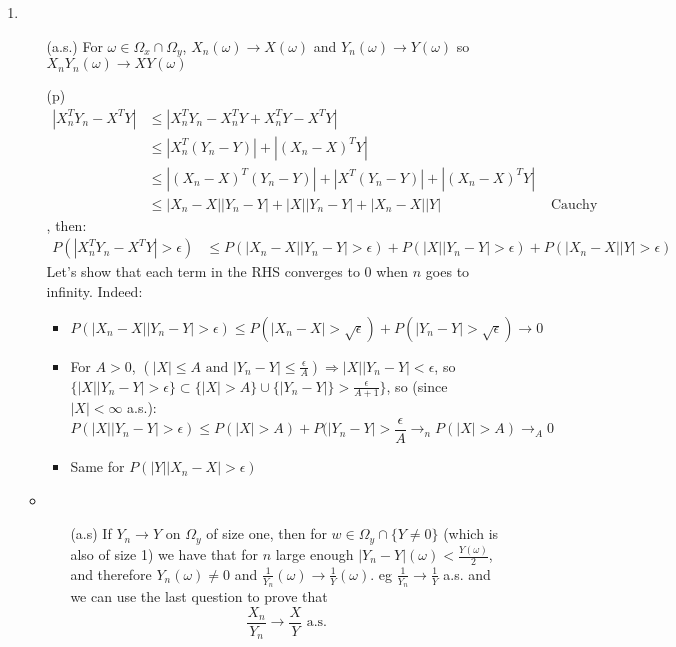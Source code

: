 \documentclass[12pt]{article}
\begin{document}
\begin{enumerate}
  \item 
    \begin{itemize}
    \item[(a.s.)] For $\omega \in \Omega_x \cap \Omega_y$, $X_n(\omega) \rightarrow X(\omega)$ and $Y_n(\omega) \rightarrow Y(\omega)$ so $X_nY_n(\omega) \rightarrow XY(\omega)$
    \item[(p)]
    \begin{align*}|X_n^TY_n - X^TY| &\le |X_n^TY_n - X_n^TY + X_n^TY -
      X^TY| \\&\le |X_n^T(Y_n - Y)| + |(X_n-X)^TY| \\&\le
      |(X_n-X)^T(Y_n - Y)| + |X^T(Y_n-Y)| + |(X_n-X)^TY| \\&\le
      |X_n-X| |Y_n - Y| + |X| |Y_n-Y| + |X_n-X| |Y| &\text{ Cauchy
        Shwartz}
    \end{align*}
    , then:
    \begin{align*}
      P(|X_n^TY_n - X^TY| > \epsilon)
      &\le P(|X_n-X| |Y_n - Y|  > \epsilon) + P(|X| |Y_n-Y| > \epsilon) + P(|X_n-X| |Y| > \epsilon)
    \end{align*}
    Let's show that each term in the RHS converges to 0 when $n$ goes
    to infinity. Indeed:
    \begin{itemize}
    \item
      $P(|X_n-X| |Y_n - Y| > \epsilon)\le P(|X_n - X| >
      \sqrt{\epsilon}) + P(|Y_n - Y| > \sqrt{\epsilon}) \rightarrow 0$
    \item For $A > 0$,
      $(|X| \le A \text{ and } |Y_n-Y| \le \frac{\epsilon}{A}) \Rightarrow |X|
      |Y_n - Y| < \epsilon$,
      so
      $\{|X| |Y_n - Y| > \epsilon \} \subset \{|X|>A\} \cup \{|Y_n-Y|
      \} > \frac{\epsilon}{A+1}\}$, so (since $|X| < \infty$ a.s.):
    $$P(|X| |Y_n-Y| > \epsilon) \le P(|X| > A) + P(|Y_n - Y| > \frac{\epsilon}{A} \rightarrow_n P(|X| > A) \rightarrow_A 0$$
  \item Same for $P(|Y| |X_n-X| > \epsilon)$
  \end{itemize}
  
\item
  \begin{itemize}
  \item[(a.s)] If $Y_n \rightarrow Y$ on $\Omega_y$ of size one, then for
    $w \in \Omega_y \cap \{Y \ne 0\}$ (which is also of size 1) we have
    that for $n$ large enough $|Y_n - Y|(\omega) < \frac{Y(\omega)}2$,
    and therefore $Y_n(\omega) \ne 0$ and
    $\frac1{Y_n}(\omega) \rightarrow \frac1 Y(\omega)$. eg
    $\frac1 {Y_n} \rightarrow \frac1 Y$ a.s. and we can use the last
    question to prove that
  $$\frac{X_n}{Y_n} \rightarrow \frac{X}{Y} \text{ a.s.} $$


\end{itemize}
\end{itemize}
\end{enumerate}
\end{document}
